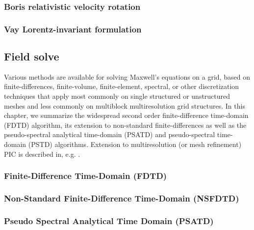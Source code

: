 \documentclass[]{report}
\begin{document}
\subsubsection{Boris relativistic velocity rotation}


\subsubsection{Vay Lorentz-invariant formulation}


\subsection{Field solve}

Various methods are available for solving Maxwell's equations on a
grid, based on finite-differences, finite-volume, finite-element,
spectral, or other discretization techniques that apply most commonly
on single structured or unstructured meshes and less commonly on multiblock
multiresolution grid structures. In this chapter, we summarize the widespread
second order finite-difference time-domain (FDTD) algorithm, its extension
to non-standard finite-differences as well as the pseudo-spectral
analytical time-domain (PSATD) and pseudo-spectral time-domain (PSTD)
algorithms. Extension to multiresolution (or mesh refinement) PIC
is described in, e.g. \cite{VayCSD12,Vaycpc04}.

\subsubsection{Finite-Difference Time-Domain (FDTD)}


\subsubsection{Non-Standard Finite-Difference Time-Domain (NSFDTD)}


\subsubsection{Pseudo Spectral Analytical Time Domain (PSATD)}

\end{document}
